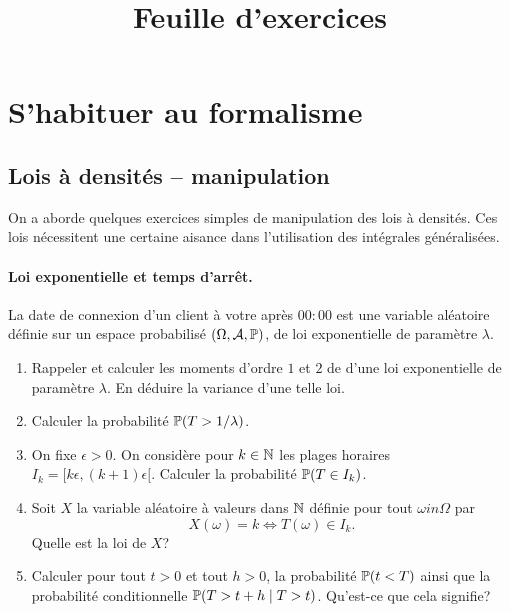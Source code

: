 \documentclass[11pt, a4paper]{article}
\title{%
  { \huge Feuille d'exercices}%
}
\author{}
\date{}
\begin{document}
\maketitle\thispagestyle{fancy}

\section{S'habituer au formalisme}
\label{sec:formalisme}


\subsection{Lois à densités -- manipulation}

On a aborde quelques exercices simples de manipulation des lois à
densités. Ces lois nécessitent une certaine aisance dans l'utilisation
des intégrales généralisées.

\paragraph{Loi exponentielle et temps d'arrêt.}

La date de connexion d'un client à votre après $00:00$ est une
variable aléatoire définie sur un espace probabilisé
$(\Omega, \mathcal{A}, \mathbb{P})$, de loi exponentielle de paramètre
$\lambda$.
\begin{question}
  \begin{enumerate}
  \item
    Rappeler et calculer les moments d'ordre $1$ et $2$ de d'une loi
    exponentielle de paramètre $\lambda$. En déduire la variance d'une
    telle loi.
  \item
    Calculer la probabilité $\mathbb{P}(T > 1/\lambda)$.
  \item
    On fixe $\epsilon > 0$. On considère pour $k \in \mathbb{N}$ les plages
    horaires $I_k = [k\epsilon, (k+1)\epsilon[$. Calculer la
    probabilité $\mathbb{P}(T \in I_k)$.
  \item
    Soit $X$ la variable aléatoire à valeurs dans $\mathbb{N}$ définie pour
    tout $\omega in \Omega$ par
    \[
    X(\omega) = k \Leftrightarrow T(\omega) \in I_k.
    \]
    Quelle est la loi de $X$?
  \item
    Calculer pour tout $t > 0$ et tout $h > 0$, la probabilité
    $\mathbb{P}(t < T)$ ainsi que la probabilité conditionnelle
    $\mathbb{P}(T > t+h \mid T > t)$. Qu'est-ce que cela signifie?
  \end{enumerate}
\end{question}
\end{document}
